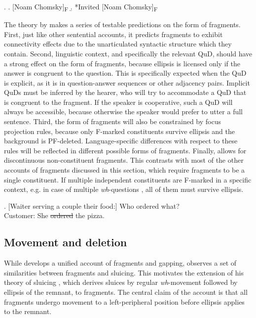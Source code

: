 \ex. \a. [Noam Chomsky]\textsubscript{F}
     \b. *Invited [Noam Chomsky]\textsubscript{F}

The theory by \citet{reich2007} makes a series of testable predictions on the form of fragments. First, just like other sentential accounts, it predicts fragments to exhibit connectivity effects due to the unarticulated syntactic structure which they contain. Second, linguistic context, and specifically the relevant QuD, should have a strong effect on the form of fragments, because ellipsis is licensed only if the answer is congruent to the question. This is specifically expected when the QuD is explicit, as it is in question-answer sequences or other adjacency pairs. Implicit QuDs must be inferred by the hearer, who will try to accommodate a QuD that is congruent to the fragment. If the speaker is cooperative, such a QuD will always be accessible, because otherwise the speaker would prefer to utter a full sentence. Third, the form of fragments will also be constrained by focus projection rules, because only F-marked constituents survive ellipsis and the background is PF-deleted. Language-specific differences with respect to these rules will be reflected in different possible forms of fragments. Finally, \citet{reich2007} allows for discontinuous non-constituent fragments. This contrasts with most of the other accounts of fragments discussed in this section, which require fragments to be a single constituent. If multiple independent constituents are F-marked in a specific context, e.g. in case of multiple \textit{wh}-questions \Next, all of them must survive ellipsis.

\ex. [Waiter serving a couple their food:] Who ordered what?\\
Customer: She \sout{ordered} the pizza. \label{ex:theories-discontinuous-en-pizza}


\subsection{Movement and deletion} \label{sec:theories-movement}

While \citet{reich2007} develops a unified account of fragments and gapping, \citet{merchant2004} observes a set of similarities between fragments and sluicing. This motivates the extension of his theory of sluicing \citep{merchant2001}, which derives sluices by regular \textit{wh}-movement followed by ellipsis of the remnant, to fragments. The central claim of the account is that all fragments undergo movement to a left-peripheral position before ellipsis applies to the remnant.

